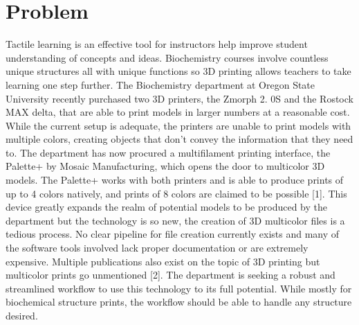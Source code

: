 \documentclass[onecolumn, draftclsnofoot,10pt, compsoc]{IEEEtran}
\begin{document}
\section{Problem}
Tactile learning is an effective tool for instructors help improve student understanding of concepts and ideas.
Biochemistry courses involve countless unique structures all with unique functions so 3D printing allows teachers to take learning one step further.
The Biochemistry department at Oregon State University recently purchased two 3D printers, the Zmorph 2.
0S and the Rostock MAX delta, that are able to print models in larger numbers at a reasonable cost.
While the current setup is adequate, the printers are unable to print models with multiple colors, creating objects that don’t convey the information that they need to.
The department has now procured a multifilament printing interface, the Palette+ by Mosaic Manufacturing, which opens the door to multicolor 3D models.
The Palette+ works with both printers and is able to produce prints of up to 4 colors natively, and prints of 8 colors are claimed to be possible [1].
This device greatly expands the realm of potential models to be produced by the department but the technology is so new, the creation of 3D multicolor files is a tedious process.
No clear pipeline for file creation currently exists and many of the software tools involved lack proper documentation or are extremely expensive.
Multiple publications also exist on the topic of 3D printing but multicolor prints go unmentioned [2].
The department is seeking a robust and streamlined workflow to use this technology to its full potential.
While mostly for biochemical structure prints, the workflow should be able to handle any structure desired.
 
\end{document}
